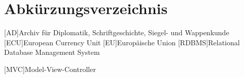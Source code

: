 \clearpage
\chapter*{Abkürzungsverzeichnis}	

\begin{acronym}[XXXXXXX]
	[AD]{Archiv für Diplomatik, Schriftgeschichte, Siegel- und Wappenkunde}
	[ECU]{European Currency Unit}
	[EU]{Europäische Union}
	[RDBMS]{Relational Database Management System}

	[MVC]{Model-View-Controller}
\end{acronym}
